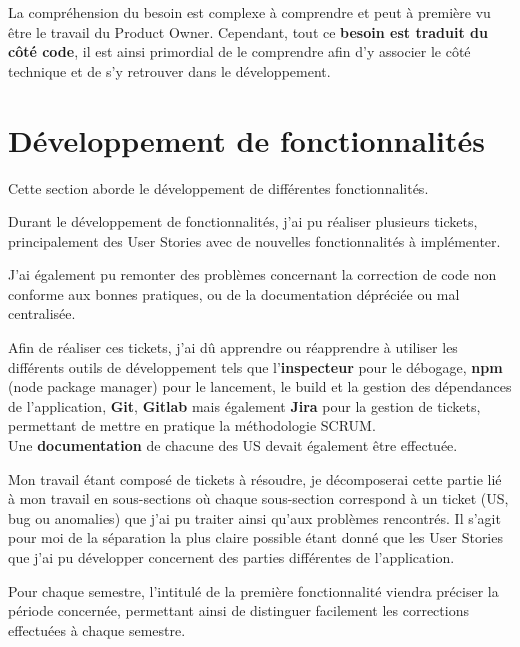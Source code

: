 \documentclass{article}
\begin{document}
La compréhension du besoin est complexe à comprendre et peut à première vu être le travail du Product Owner. Cependant, tout ce \textbf{besoin est traduit du côté code}, il est ainsi primordial de le comprendre afin d'y associer le côté technique et de s'y retrouver dans le développement.



\newpage
\section{Développement de fonctionnalités}

Cette section aborde le développement de différentes fonctionnalités.

Durant le développement de fonctionnalités, j'ai pu réaliser plusieurs tickets, principalement des User Stories avec de nouvelles fonctionnalités à implémenter.

J'ai également pu remonter des problèmes concernant la correction de code non conforme aux bonnes pratiques, ou de la documentation dépréciée ou mal centralisée.

Afin de réaliser ces tickets, j'ai dû apprendre ou réapprendre à utiliser les différents outils de développement tels que l'\textbf{inspecteur} pour le débogage, \textbf{npm} (node package manager) pour le lancement, le build et la gestion des dépendances de l'application, \textbf{Git}, \textbf{Gitlab} mais également \textbf{Jira} pour la gestion de tickets, permettant de mettre en pratique la méthodologie SCRUM. \\

Une \textbf{documentation} de chacune des US devait également être effectuée.

Mon travail étant composé de tickets à résoudre, je décomposerai cette partie lié à mon travail en sous-sections où chaque sous-section correspond à un ticket (US, bug ou anomalies) que j'ai pu traiter ainsi qu'aux problèmes rencontrés. Il s'agit pour moi de la séparation la plus claire possible étant donné que les User Stories que j'ai pu développer concernent des parties différentes de l'application.

Pour chaque semestre, l’intitulé de la première fonctionnalité viendra préciser la période concernée, permettant ainsi de distinguer facilement les corrections effectuées à chaque semestre.
\end{document}
